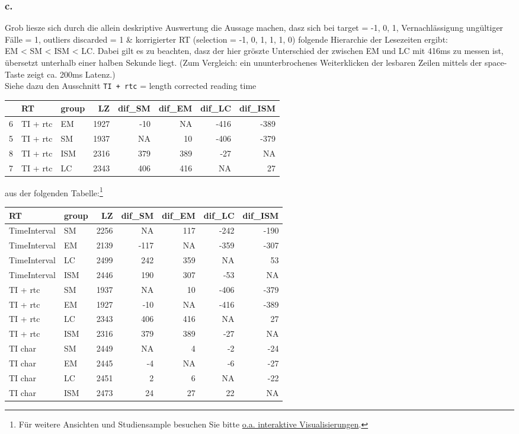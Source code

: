 \documentclass[
]{article}
\begin{document}
\hypertarget{c.}{%
\subsubsection{c.}\label{c.}}

Grob liesze sich durch die allein deskriptive Auswertung die Aussage machen, dasz sich bei target = -1, 0, 1, Vernachlässigung ungültiger Fälle = 1, outliers discarded = 1 \& korrigierter RT (selection = -1, 0, 1, 1, 1, 0) folgende Hierarchie der Lesezeiten ergibt:\\
EM \textless{} SM \textless{} ISM \textless{} LC. Dabei gilt es zu beachten, dasz der hier gröszte Unterschied der zwischen EM und LC mit 416ms zu messen ist, übersetzt unterhalb einer halben Sekunde liegt. (Zum Vergleich: ein ununterbrochenes Weiterklicken der lesbaren Zeilen mittels der space-Taste zeigt ca. 200ms Latenz.)\\
Siehe dazu den Ausschnitt \texttt{TI\ +\ rtc} = length corrected reading time

\begin{tabular}{l|l|l|r|r|r|r|r}
\hline
  & RT & group & LZ & dif\_SM & dif\_EM & dif\_LC & dif\_ISM\\
\hline
6 & TI + rtc & EM & 1927 & -10 & NA & -416 & -389\\
\hline
5 & TI + rtc & SM & 1937 & NA & 10 & -406 & -379\\
\hline
8 & TI + rtc & ISM & 2316 & 379 & 389 & -27 & NA\\
\hline
7 & TI + rtc & LC & 2343 & 406 & 416 & NA & 27\\
\hline
\end{tabular}

aus der folgenden Tabelle:\footnote{Für weitere Ansichten und Studiensample besuchen Sie bitte \href{https://vision2020.shinyapps.io/hux2021}{o.a. interaktive Visualisierungen}.}

\begin{tabular}{l|l|r|r|r|r|r}
\hline
RT & group & LZ & dif\_SM & dif\_EM & dif\_LC & dif\_ISM\\
\hline
TimeInterval & SM & 2256 & NA & 117 & -242 & -190\\
\hline
TimeInterval & EM & 2139 & -117 & NA & -359 & -307\\
\hline
TimeInterval & LC & 2499 & 242 & 359 & NA & 53\\
\hline
TimeInterval & ISM & 2446 & 190 & 307 & -53 & NA\\
\hline
TI + rtc & SM & 1937 & NA & 10 & -406 & -379\\
\hline
TI + rtc & EM & 1927 & -10 & NA & -416 & -389\\
\hline
TI + rtc & LC & 2343 & 406 & 416 & NA & 27\\
\hline
TI + rtc & ISM & 2316 & 379 & 389 & -27 & NA\\
\hline
TI char & SM & 2449 & NA & 4 & -2 & -24\\
\hline
TI char & EM & 2445 & -4 & NA & -6 & -27\\
\hline
TI char & LC & 2451 & 2 & 6 & NA & -22\\
\hline
TI char & ISM & 2473 & 24 & 27 & 22 & NA\\
\hline
\end{tabular}
\end{document}
